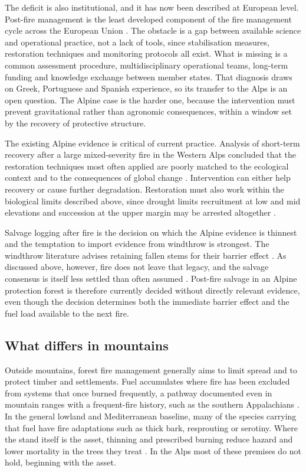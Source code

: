 \documentclass[11pt,a4paper]{article}
\begin{document}
The deficit is also institutional, and it has now been described at European level. Post-fire management is the least developed component of the fire management cycle across the European Union \citep{vieira_postfire_2026}. The obstacle is a gap between available science and operational practice, not a lack of tools, since stabilisation measures, restoration techniques and monitoring protocols all exist. What is missing is a common assessment procedure, multidisciplinary operational teams, long-term funding and knowledge exchange between member states. That diagnosis draws on Greek, Portuguese and Spanish experience, so its transfer to the Alps is an open question. The Alpine case is the harder one, because the intervention must prevent gravitational rather than agronomic consequences, within a window set by the recovery of protective structure.

The existing Alpine evidence is critical of current practice. Analysis of short-term recovery after a large mixed-severity fire in the Western Alps concluded that the restoration techniques most often applied are poorly matched to the ecological context and to the consequences of global change \citep{mantero_short-term_2023}. Intervention can either help recovery or cause further degradation. Restoration must also work within the biological limits described above, since drought limits recruitment at low and mid elevations \citep{moser_potential_2010} and succession at the upper margin may be arrested altogether \citep{degiuli_arrested_2024}.

Salvage logging after fire is the decision on which the Alpine evidence is thinnest and the temptation to import evidence from windthrow is strongest. The windthrow literature advises retaining fallen stems for their barrier effect \citep{costa_biological_2021}. As discussed above, however, fire does not leave that legacy, and the salvage consensus is itself less settled than often assumed \citep{seben_impact_2024}. Post-fire salvage in an Alpine protection forest is therefore currently decided without directly relevant evidence, even though the decision determines both the immediate barrier effect and the fuel load available to the next fire.

\subsection{What differs in mountains}

Outside mountains, forest fire management generally aims to limit spread and to protect timber and settlements. Fuel accumulates where fire has been excluded from systems that once burned frequently, a pathway documented even in mountain ranges with a frequent-fire history, such as the southern Appalachians \citep{reilly_drivers_2022}. In the general lowland and Mediterranean baseline, many of the species carrying that fuel have fire adaptations such as thick bark, resprouting or serotiny. Where the stand itself is the asset, thinning and prescribed burning reduce hazard and lower mortality in the trees they treat \citep{brodie_forest_2024}. In the Alps most of these premises do not hold, beginning with the asset.
\end{document}
